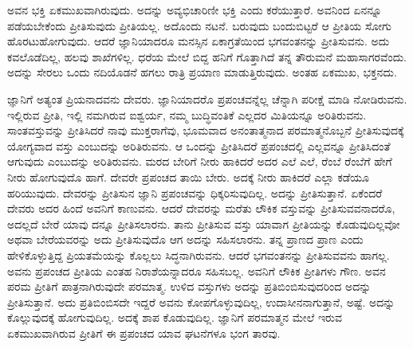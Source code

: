 ಅವನ ಭಕ್ತಿ ಏಕಮುಖವಾಗಿರುವುದು. ಅದನ್ನು ಅವ್ಯಭಿಚಾರಿಣೀ ಭಕ್ತಿ ಎಂದು ಕರೆಯುತ್ತಾರೆ. ಅವನಿಂದ ಏನನ್ನೂ ಪಡೆಯಬೇಕೆಂದು ಪ್ರೀತಿಸುವುದು ಪ್ರೀತಿಯಲ್ಲ. ಅದೊಂದು ನಟನೆ. ಬರುವುದು ಬಂದುಬಿಟ್ಟರೆ ಆ ಪ್ರೀತಿಯ ಸೋಗು ಹೊರಟುಹೋಗುವುದು. ಆದರೆ ಜ್ಞಾನಿಯಾದರೂ ಮನಸ್ಸಿನ ಏಕಾಗ್ರತೆಯಿಂದ ಭಗವಂತನನ್ನು ಪ್ರೀತಿಸುವನು. ಅದು ಕವಲೊಡೆದಿಲ್ಲ, ಹಲವು ಶಾಖೆಗಳಿಲ್ಲ. ಧರೆಯ ಮೇಲೆ ಬಿದ್ದ ಹನಿಗೆ ಗೊತ್ತಾಗಿದೆ ತನ್ನ ತೌರುಮನೆ ಮಹಾಸಾಗರವೆಂದು. ಅದನ್ನು ಸೇರಲು ಒಂದು ನದಿಯೊಡನೆ ಹಗಲು ರಾತ್ರಿ ಪ್ರಯಾಣ ಮಾಡುತ್ತಿರುವುದು. ಅಂತಹ ಏಕಮುಖ, ಭಕ್ತನದು.

ಜ್ಞಾನಿಗೆ ಅತ್ಯಂತ ಪ್ರಿಯನಾದವನು ದೇವರು. ಜ್ಞಾನಿಯಾದರೊ ಪ್ರಪಂಚವನ್ನೆಲ್ಲ ಚೆನ್ನಾಗಿ ಪರೀಕ್ಷೆ ಮಾಡಿ ನೋಡಿರುವನು. ಇಲ್ಲಿರುವ ಪ್ರೀತಿ, ಇಲ್ಲಿ ನಮಗಿರುವ ಐಶ್ವರ್ಯ, ನಮ್ಮ ಬುದ್ಧಿವಂತಿಕೆ ಎಲ್ಲದರ ಮಿತಿಯನ್ನೂ ಅರಿತಿರುವನು. ಸಾಂತವಸ್ತುವನ್ನು ಪ್ರೀತಿಸಿದರೆ ನಾವು ಮುಕ್ತರಾಗೆವು, ಭೂಮವಾದ ಅನಂತಾತ್ಮನಾದ ಪರಮಾತ್ಮನೊಬ್ಬನೆ ಪ್ರೀತಿಸುವುದಕ್ಕೆ ಯೋಗ್ಯವಾದ ವಸ್ತು ಎಂಬುದನ್ನು ಅರಿತಿರುವನು. ಆ ಒಂದನ್ನು ಪ್ರೀತಿಸಿದರೆ ಪ್ರಪಂಚದಲ್ಲಿ ಎಲ್ಲವನ್ನೂ ಪ್ರೀತಿಸಿದಂತೆ ಆಗುವುದು ಎಂಬುದನ್ನು ಅರಿತಿರುವನು. ಮರದ ಬೇರಿಗೆ ನೀರು ಹಾಕಿದರೆ ಅದರ ಎಲೆ ಎಲೆ, ರೆಂಬೆ ರೆಂಬೆಗೆ ಹೇಗೆ ನೀರು ಹೋಗುವುದೊ ಹಾಗೆ. ದೇವರೇ ಪ್ರಪಂಚದ ತಾಯಿ ಬೇರು. ಅದಕ್ಕೆ ನೀರು ಹಾಕಿದರೆ ಎಲ್ಲಾ ಕಡೆಯೂ ಹರಿಯುವುದು. ದೇವರನ್ನು ಪ್ರೀತಿಸುನ ಜ್ಞಾನಿ ಪ್ರಪಂಚವನ್ನು ಧಿಕ್ಕರಿಸುವುದಿಲ್ಲ. ಅದನ್ನು ಪ್ರೀತಿಸುತ್ತಾನೆ. ಏಕೆಂದರೆ ದೇವರು ಅದರ ಹಿಂದೆ ಅವನಿಗೆ ಕಾಣುವನು. ಆದರೆ ದೇವರನ್ನು ಮರೆತು ಲೌಕಿಕ ವಸ್ತುವನ್ನು ಪ್ರೀತಿಸುವವನಾದರೊ, ಅದಲ್ಲದೆ ಬೇರೆ ಯಾವು ದನ್ನೂ ಪ್ರೀತಿಸಲಾರನು. ತಾನು ಪ್ರೀತಿಸುವ ವಸ್ತು ಯಾವಾಗ ಪ್ರೀತಿಯನ್ನು ಕೊಡುವುದಿಲ್ಲವೋ ಅಥವಾ ಬೇರೆಯವರನ್ನು ಅದು ಪ್ರೀತಿಸುವುದೊ ಆಗ ಅದನ್ನು ಸಹಿಸಲಾರನು. ತನ್ನ ಪ್ರಾಣದ ಪ್ರಾಣ ಎಂದು ಹೇಳಿಕೊಳ್ಳುತ್ತಿದ್ದ ಪ್ರಿಯತಮೆಯನ್ನು ಕೊಲ್ಲಲು ಸಿದ್ಧನಾಗಿರುವನು. ಆದರೆ ಭಗವಂತನನ್ನು ಪ್ರೀತಿಸುವವನು ಹಾಗಲ್ಲ. ಅವನು ಪ್ರಪಂಚದ ಪ್ರೀತಿಯ ಎಂತಹ ನಿರಾಶೆಯನ್ನಾದರೂ ಸಹಿಸಬಲ್ಲ. ಅವನಿಗೆ ಲೌಕಿಕ ಪ್ರೀತಿಗಳು ಗೌಣ. ಅವನ ಪರಮ ಪ್ರೀತಿಗೆ ಪಾತ್ರನಾಗಿರುವುದೇ ಪರಮಾತ್ಮ. ಉಳಿದ ವಸ್ತುಗಳು ಅದನ್ನು ಪ್ರತಿಬಿಂಬಿಸುವುದರಿಂದ ಅದನ್ನು ಪ್ರೀತಿಸುತ್ತಾನೆ. ಅದು ಪ್ರತಿಬಿಂಬಿಸದೇ ಇದ್ದರೆ ಅವನು ಕೋಪಗೊಳ್ಳುವುದಿಲ್ಲ, ಉದಾಸೀನನಾಗುತ್ತಾನೆ, ಅಷ್ಟೆ. ಅದನ್ನು ಕೊಲ್ಲುವುದಕ್ಕೆ ಹೋಗುವುದಿಲ್ಲ. ಅದಕ್ಕೆ ಶಾಪ ಕೊಡುವುದಿಲ್ಲ. ಜ್ಞಾನಿಗೆ ಪರಮಾತ್ಮನ ಮೇಲೆ ಇರುವ ಏಕಮುಖವಾಗಿರುವ ಪ್ರೀತಿಗೆ ಈ ಪ್ರಪಂಚದ ಯಾವ ಘಟನೆಗಳೂ ಭಂಗ ತಾರವು.

